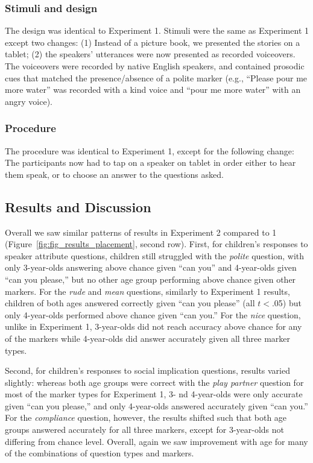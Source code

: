 \documentclass[10pt, letterpaper]{article}
\begin{document}
\subsubsection{Stimuli and design}\label{stimuli-and-design-1}

The design was identical to Experiment 1. Stimuli were the same as
Experiment 1 except two changes: (1) Instead of a picture book, we
presented the stories on a tablet; (2) the speakers' utterances were now
presented as recorded voiceovers. The voiceovers were recorded by native
English speakers, and contained prosodic cues that matched the
presence/absence of a polite marker (e.g., ``Please pour me more water''
was recorded with a kind voice and ``pour me more water'' with an angry
voice).

\subsubsection{Procedure}\label{procedure-1}

The procedure was identical to Experiment 1, except for the following
change: The participants now had to tap on a speaker on tablet in order
either to hear them speak, or to choose an answer to the questions
asked.

\subsection{Results and Discussion}\label{results-and-discussion-1}

Overall we saw similar patterns of results in Experiment 2 compared to 1
(Figure~\ref{fig:fig_results_placement}, second row). First, for
children's responses to speaker attribute questions, children still
struggled with the \emph{polite} question, with only 3-year-olds
answering above chance given ``can you'' and 4-year-olds given ``can you
please,'' but no other age group performing above chance given other
markers. For the \emph{rude} and \emph{mean} questions, similarly to
Experiment 1 results, children of both ages answered correctly given
``can you please'' (all \(t<\).05) but only 4-year-olds performed above
chance given ``can you.'' For the \emph{nice} question, unlike in
Experiment 1, 3-year-olds did not reach accuracy above chance for any of
the markers while 4-year-olds did answer accurately given all three
marker types.

Second, for children's responses to social implication questions,
results varied slightly: whereas both age groups were correct with the
\emph{play partner} question for most of the marker types for Experiment
1, 3- nd 4-year-olds were only accurate given ``can you please,'' and
only 4-year-olds answered accurately given ``can you.'' For the
\emph{compliance} question, however, the results shifted such that both
age groups answered accurately for all three markers, except for
3-year-olds not differing from chance level. Overall, again we saw
improvement with age for many of the combinations of question types and
markers.
\end{document}
